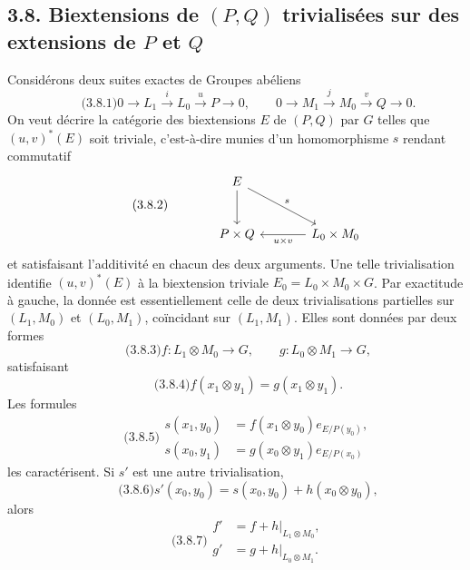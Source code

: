 \documentclass[11pt]{article}
\begin{document}
\subsection*{3.8. Biextensions de \((P,Q)\) trivialisées sur des extensions de \(P\) et \(Q\)}

Considérons deux suites exactes de Groupes abéliens
\begin{equation}\qquad\text{(3.8.1)}
        0\to L_1\xrightarrow{i}L_0\xrightarrow{u}P\to0,
        \qquad
        0\to M_1\xrightarrow{j}M_0\xrightarrow{v}Q\to0.
\end{equation}
On veut décrire la catégorie des biextensions \(E\) de \((P,Q)\) par \(G\) telles que \((u,v)^*(E)\) soit triviale, c'est-à-dire munies d'un homomorphisme \(s\) rendant commutatif
\begin{equation}\qquad\text{(3.8.2)}
\begin{tikzcd}[column sep=large,row sep=large]
& E \arrow[d] \arrow[dr,"s"]&\\
& P\times Q & L_0\times M_0 \arrow[l,"u\times v"]
\end{tikzcd}
\end{equation}
et satisfaisant l'additivité en chacun des deux arguments.  Une telle trivialisation identifie \((u,v)^*(E)\) à la biextension triviale \(E_0=L_0\times M_0\times G\).  Par exactitude à gauche, la donnée est essentiellement celle de deux trivialisations partielles sur \((L_1,M_0)\) et \((L_0,M_1)\), coïncidant sur \((L_1,M_1)\).  Elles sont données par deux formes
\begin{equation}\qquad\text{(3.8.3)}
        f:L_1\otimes M_0\to G,
        \qquad
        g:L_0\otimes M_1\to G,
\end{equation}
satisfaisant
\begin{equation}\qquad\text{(3.8.4)}
        f(x_1\otimes y_1)=g(x_1\otimes y_1).
\end{equation}
Les formules
\begin{equation}\qquad\text{(3.8.5)}
\begin{aligned}
 s(x_1,y_0)&=f(x_1\otimes y_0)e_{E/P(y_0)},\\
 s(x_0,y_1)&=g(x_0\otimes y_1)e_{E/P(x_0)}
\end{aligned}
\end{equation}
les caractérisent.  Si \(s'\) est une autre trivialisation,
\begin{equation}\qquad\text{(3.8.6)}
        s'(x_0,y_0)=s(x_0,y_0)+h(x_0\otimes y_0),
\end{equation}
alors
\begin{equation}\qquad\text{(3.8.7)}
\begin{aligned}
 f'&=f+h|_{L_1\otimes M_0},\\
 g'&=g+h|_{L_0\otimes M_1}.
\end{aligned}
\end{equation}
\end{document}
